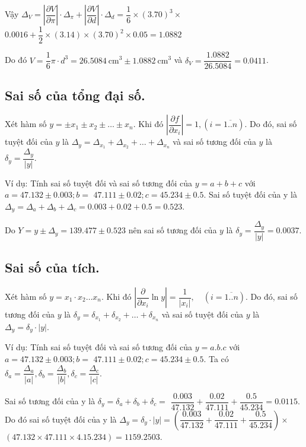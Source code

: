 \documentclass[12pt, a4paper]{report}
\begin{document}
Vậy $\Delta_V=\left|\dfrac{\partial V}{\partial \pi}\right| \cdot \Delta_\pi+\left|\dfrac{\partial V}{\partial d}\right| \cdot \Delta_d=\dfrac{1}{6} \times(3.70)^3 \times$
$0.0016+\dfrac{1}{2} \times(3.14) \times(3.70)^2 \times 0.05=1.0882$

Do đó $V=\dfrac{1}{6} \pi \cdot d^3=26.5084 \mathrm{~cm}^3 \pm 1.0882 \mathrm{~cm}^3$ và
$\delta_V=\dfrac{1.0882}{26.5084}=0.0411$.
\subsection{Sai số của tổng đại số.}    
Xét hàm số $y= \pm x_1 \pm x_2 \pm \ldots \pm x_n$. Khi đó $\left|\dfrac{\partial f}{\partial x_i}\right|=1,(i=\overline{1 . . n})$. Do đó, sai số tuyệt đối của $y$ là $\Delta_y=\Delta_{x_1}+\Delta_{x_2}+\ldots+\Delta_{x_n}$ và sai số tương đối của $y$ là $\delta_y=\dfrac{\Delta_y}{|y|}$.

Ví dụ: Tính sai số tuyệt đối và sai số tương đối của $y=a+b+c$ với $a=47.132 \pm 0.003 ; b=$ $47.111 \pm 0.02 ; c=45.234 \pm 0.5$.
Sai số tuyệt đối của y là $\Delta_y=\Delta_a+\Delta_b+\Delta_c=0.003+0.02+0.5=0.523$.

Do $Y=y \pm \Delta_y=139.477 \pm 0.523$ nên sai số tương đối của $y$ là $\delta_y=\dfrac{\Delta_y}{|y|}=0.0037$.
\subsection{Sai số của tích.}
Xét hàm số $y=x_1 \cdot x_2 \ldots x_n$. Khi đó $\left|\dfrac{\partial}{\partial x_i} \ln y\right|=\dfrac{1}{\left|x_i\right|}, \quad(i=\overline{1 . . n})$. Do đó, sai số tương đối của $y$ là $\delta_y=\delta_{x_1}+\delta_{x_2}+\ldots+\delta_{x_n}$ và sai số tuyệt đối của $y$ là $\Delta_y=\delta_y \cdot|y|$.

Ví dụ: Tính sai số tuyệt đối và sai số tương đối của $y=a . b . c$ với $a=47.132 \pm 0.003 ; b=$ $47.111 \pm 0.02 ; c=45.234 \pm 0.5$. Ta có $\delta_a=\dfrac{\Delta_a}{|a|}, \delta_b=\dfrac{\Delta_b}{|b|}, \delta_c=\dfrac{\Delta_c}{|c|}.$

Sai số tương đối của y là $\delta_y=\delta_a+\delta_b+\delta_c=$ $\dfrac{0.003}{47.132}+\dfrac{0.02}{47.111}+\dfrac{0.5}{45.234}=0.0115$.
Do đó sai số tuyệt đối của y là $\Delta_y=\delta_y \cdot|y|=\left(\dfrac{0.003}{47.132}+\dfrac{0.02}{47.111}+\dfrac{0.5}{45.234}\right) \times$ $(47.132 \times 47.111 \times 4.15 .234)=1159.2503$.
\end{document}
